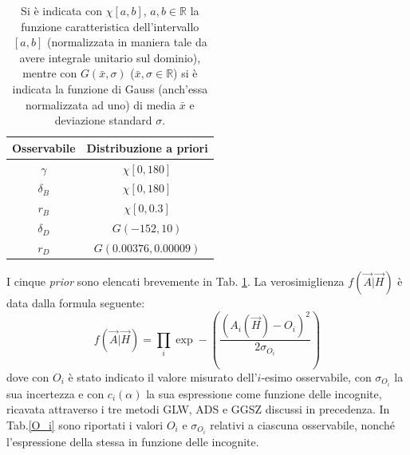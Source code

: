 \begin{table}
\begin{center}
\begin{tabular}{|c|c|}
\hline
\textbf{Osservabile} & \textbf{Distribuzione a priori}\\\hline
$\gamma$ & $\chi[0 , 180]$\\\hline
$\delta_B$ & $\chi[0,180]$\\\hline
$r_B$ & $\chi[0, 0.3]$\\\hline
$\delta_D$ & $G(-152, 10)$\\\hline
$r_D$ & $G(0.00376, 0.00009)$\\\hline
\end{tabular}
\end{center}
\caption{Si è indicata con $\chi[a,b]$, $a,b \in \mathbb{R}$ la funzione caratteristica dell'intervallo $[a,b]$ (normalizzata in maniera tale da avere integrale unitario sul dominio), 
mentre con $G(\bar{x}, \sigma)$ ($\bar{x}, \sigma \in \mathbb{R}$) si è indicata la funzione di Gauss (anch'essa normalizzata ad uno) di media $\bar{x}$ e deviazione standard $\sigma$.}
\label{tabellaprior}
\end{table}
I cinque \emph{prior} sono elencati brevemente in Tab. \ref{tabellaprior}.
La verosimiglienza $f(\vec{A}|\vec{H})$ è data dalla formula seguente:
\begin{equation}
 f(\vec{A}|\vec{H}) = \prod_i \exp-\left(\frac{(A_i(\vec{H}) - O_i)^2}{2\sigma_{O_i}}\right)
\end{equation}
dove con $O_i$ è stato indicato il valore misurato dell'$i$-esimo osservabile, con $\sigma_{O_i}$ la sua incertezza e con $c_i(\alpha)$ la sua espressione come funzione delle
incognite, ricavata attraverso i tre metodi GLW, ADS e GGSZ discussi in precedenza.
In Tab.\ref{O_i} sono riportati i valori $O_i$ e $\sigma_{O_i}$ relativi a ciascuna osservabile, nonché l'espressione della stessa in funzione delle incognite. 
